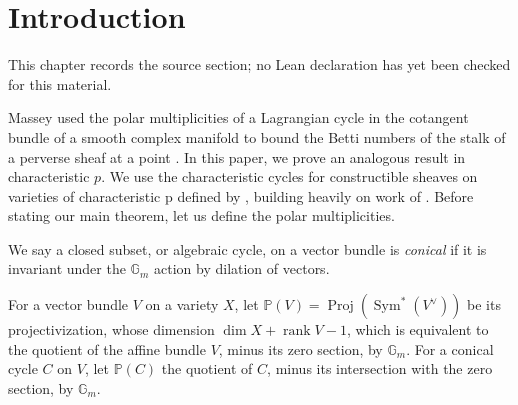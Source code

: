 \chapter{Introduction}
\label{bounds-stalks-perverse-sheaves-characteristic-p-shende-chapter-01}

\begin{remark}
\label{bounds-stalks-perverse-sheaves-characteristic-p-shende-chapter-01-source}
This chapter records the source section; no Lean declaration has yet been checked for this material.
\notready
\end{remark}

Massey used the polar multiplicities of a Lagrangian cycle in the cotangent bundle of a smooth complex manifold to bound the Betti numbers of the stalk of a perverse sheaf at a point \cite[Corollary 5.5]{Massey}. In this paper, we prove an analogous result in characteristic $p$. We use the characteristic cycles for constructible sheaves on varieties of characteristic p defined by \citet[Definition 5.10]{saito1}, building heavily on work of \citet{Beilinson}. Before stating our main theorem, let us define the polar multiplicities.

\begin{defi}
\notready We say a closed subset, or algebraic cycle, on a vector bundle is \emph{conical} if it is invariant under the $\mathbb G_m$ action by dilation of vectors. \end{defi}

\begin{defi}
\notready For a vector bundle $V$ on a variety $X$, let $\mathbb P(V) = \operatorname{Proj} (\operatorname{Sym}^* (V^\vee ))$ be its projectivization, whose dimension $\dim X + \operatorname{rank} V-1$, which is equivalent to the quotient of the affine bundle $V$, minus its zero section, by $\mathbb G_m$. For a conical cycle $C$ on $V$, let $\mathbb P(C)$ the quotient of $C$, minus its intersection with the zero section, by $\mathbb G_m$. \end{defi}

